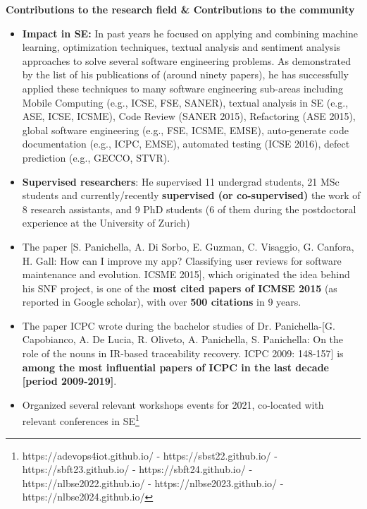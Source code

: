 \documentclass[11pt]{article}
\begin{document}
\textbf{Contributions to the research field \& Contributions to the community}
\vspace{-2.5mm}
\begin{itemize}
\item \textbf{Impact in SE:} In past years he focused on applying and combining machine learning, optimization techniques, textual analysis and sentiment analysis approaches to solve several software engineering problems. As demonstrated by the list of his publications of (around ninety papers), he has successfully applied these techniques to many software engineering sub-areas including Mobile Computing (e.g., ICSE, FSE, SANER), textual analysis in SE (e.g., ASE, ICSE, ICSME), Code Review (SANER 2015), Refactoring (ASE 2015), global software engineering (e.g., FSE, ICSME, EMSE), auto-generate code documentation (e.g., ICPC, EMSE), automated testing (ICSE 2016), defect prediction (e.g., GECCO, STVR). 
  \vspace{-2mm}
  \item 
  \textbf{Supervised researchers}: He supervised 11 undergrad students, 21 MSc students and currently/recently \textbf{supervised (or co-supervised)} the work of 8 research assistants, and 9 PhD students (6 of them during the postdoctoral experience at the University of Zurich)
  \vspace{-2mm} 
 \item The paper [S. Panichella, A. Di Sorbo, E. Guzman, C. Visaggio, G. Canfora, H. Gall: How can I improve my app? Classifying user reviews for software maintenance and evolution. ICSME 2015], which originated the idea behind his SNF project, is one of the \textbf{most cited papers of ICMSE 2015} (as reported in Google scholar), with over \textbf{500 citations} in 9 years.   
 \vspace{-2mm}
  \item The paper ICPC wrote during the bachelor studies of Dr. Panichella-[G. Capobianco, A. De Lucia, R. Oliveto, A. Panichella, S. Panichella: On the role of the nouns in IR-based traceability recovery. ICPC 2009: 148-157] is \textbf{among the most influential papers of ICPC in the last decade [period 2009-2019]}.
  \vspace{-2mm}
 \item Organized several relevant workshops events for 2021, co-located with relevant conferences in SE\footnote{https://adevops4iot.github.io/
-	https://sbst22.github.io/ - https://sbft23.github.io/ - https://sbft24.github.io/ -	https://nlbse2022.github.io/ - https://nlbse2023.github.io/ - https://nlbse2024.github.io/}
  \vspace{-2mm}
\end{itemize}
\end{document}
